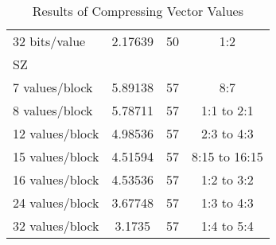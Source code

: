 \begin{table}
\begin{tabular}{l|S|r|c}
			\hspace{6mm} 32 bits/value & 2.17639 & 50 & 1:2 \\
		SZ & & & \\
		\hspace{3mm} 7 values/block & 5.89138 & 57 & 8:7 \\
		\hspace{3mm} 8 values/block & 5.78711 & 57 & 1:1 to 2:1 \\
		\hspace{3mm} 12 values/block & 4.98536 & 57 & 2:3 to 4:3 \\
		\hspace{3mm} 15 values/block & 4.51594 & 57 & 8:15 to 16:15 \\
		\hspace{3mm} 16 values/block & 4.53536 & 57 & 1:2 to 3:2 \\
		\hspace{3mm} 24 values/block & 3.67748 & 57 & 1:3 to 4:3\\
		\hspace{3mm} 32 values/block & 3.1735 & 57 & 1:4 to 5:4\\
	\end{tabular}
	\caption{Results of Compressing Vector Values}
	\label{tab:results-vec}
\end{table}

